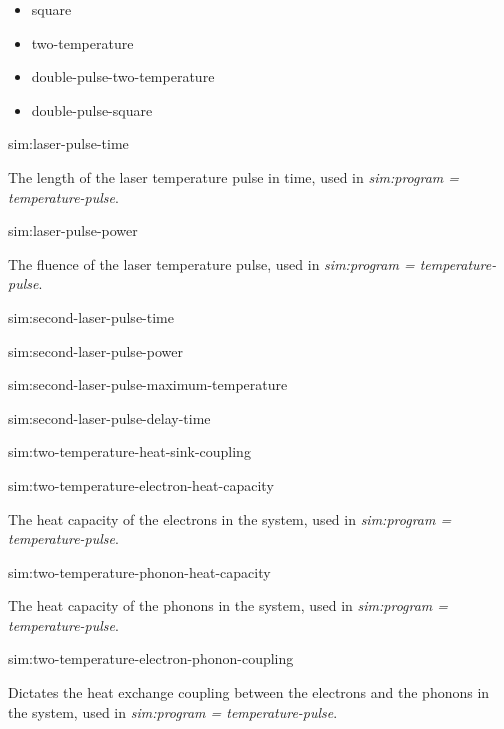 \begin{itemize}
   \item[] square
   \item[] two-temperature
   \item[] double-pulse-two-temperature
   \item[] double-pulse-square
\end{itemize}

{\zicf sim:laser-pulse-time} The length of the laser temperature pulse in time, used in \textit{sim:program = temperature-pulse}.

{\zicf sim:laser-pulse-power} The fluence of the laser temperature pulse, used in \textit{sim:program = temperature-pulse}.

{\zicf sim:second-laser-pulse-time}

{\zicf sim:second-laser-pulse-power}

{\zicf sim:second-laser-pulse-maximum-temperature}

{\zicf sim:second-laser-pulse-delay-time}

{\zicf sim:two-temperature-heat-sink-coupling}

{\zicf sim:two-temperature-electron-heat-capacity} The heat capacity of the electrons in the system, used in \textit{sim:program = temperature-pulse}.

{\zicf sim:two-temperature-phonon-heat-capacity} The heat capacity of the phonons in the system, used in \textit{sim:program = temperature-pulse}.

{\zicf sim:two-temperature-electron-phonon-coupling}
Dictates the heat exchange coupling between the electrons and the phonons in the system, used in \newline\textit{sim:program = temperature-pulse}.


